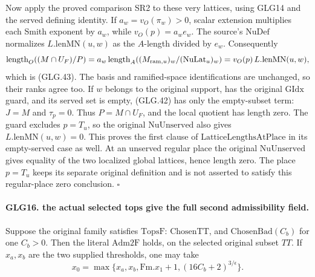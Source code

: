 \documentclass[11pt,a4paper]{article}
\numberwithin{equation}{section}
\theoremstyle{remark}\newtheorem{remark}[theorem]{Remark}
\begin{document}
Now apply the proved comparison SR2 to these very lattices,
using GLG14 and the served defining identity.
If \(a_w=v_O(\pi_w)>0\), scalar extension multiplies each
Smith exponent by \(a_w\), while \(v_O(p)=a_we_w\).
The source's \(\mathrm{NuDef}\) normalizes
\(L.\mathrm{lenMN}(u,w)\) as the \(A\)-length divided
by \(e_w\). Consequently
\[
 \operatorname{length}_O((M\cap U_F)/P)
   =a_w\operatorname{length}_A((M_{{\rm ram},u})_w/
                                             (\mathrm{NuLat}_u)_w)
   =v_O(p)\,L.\mathrm{lenMN}(u,w),
 \]
which is (GLG.43). The basis and ramified-space
identifications are unchanged, so their ranks agree too.
If \(w\) belongs to the original support, has the original
\(\mathrm{GIdx}\) guard, and its served set is empty,
(GLG.42) has only the empty-subset term:
\(J=M\) and \(\tau_p=0\). Thus \(P=M\cap U_F\), and
the local quotient has length zero. The guard excludes
\(p=T_u\), so the original
\(\mathrm{NuUnserved}\) also gives
\(L.\mathrm{lenMN}(u,w)=0\). This proves the first
clause of \(\mathrm{LatticeLengthsAtPlace}\) in its
empty-served case as well.
At an unserved regular place the original
\(\mathrm{NuUnserved}\) gives equality of the two localized
global lattices, hence length zero. The place \(p=T_u\)
keeps its separate original definition and is not
asserted to satisfy this regular-place zero conclusion.
\hfill\(\square\)

\paragraph{GLG16. the actual selected tops give the full second admissibility field.}
\label{claim:GLG16}
Suppose the original family satisfies \(\mathrm{TopsF}\):
\(\mathrm{ChosenTT}\), and \(\mathrm{ChosenBad}(C_b)\)
for one \(C_b>0\). Then the literal \(\mathrm{Adm2F}\)
holds, on the selected original subset \(TT\). If
\(x_a,x_b\) are the two supplied thresholds, one may take
\[
 x_0=\max\{x_a,x_b,\mathrm{Fm}.x_1+1,
                                     (16C_b+2)^{3/\epsilon}\}.    \tag{GLG.45}
\]
\end{document}
